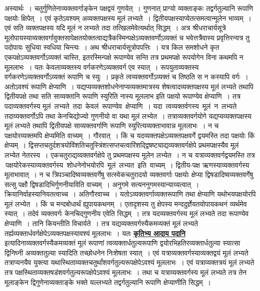 \documentclass[11pt, openany]{book}
\begin{document}
 अस्यार्थः~। चतुर्गुणितेनाव्यक्तवर्गाङ्केन पक्षद्वयं गुणयेत्~।
गुणनात् प्राग्यो व्यक्ताङ्कः तद्वर्गतुल्यानि रूपाणि पक्षयोः क्षिपेत्~। एवं
कृतेऽवश्यम् अव्यक्तपक्षस्य मूलं 
लभ्यते~। द्वितीयपक्षस्याप्येतत्समत्वान्मूलेन भाव्यम्~। एवं सति
व्यक्तपक्षस्य यदि 
मूलं न लभ्यते तदा तत्खिलमेवेत्यर्थात् सिद्धम्~। अत्र श्रीधराचार्यसूत्रे
मूलोपायस्याव्यक्तवर्गावुक्तसापेक्षतयोक्तत्वाद्यत्रैकस्मिन्पक्षेऽव्यक्तवर्णोऽव्यक्तं च
भवेत्तत्रैवास्य प्रवृत्तिरन्यत्र 
तु पदोपायः सुधिया स्वधिया चिन्त्यः~। अथ श्रीधराचार्यसूत्रोपपत्तिः~। यत्र
किल 
समशोधने कृत एकपक्षेऽव्यक्तवर्गोऽव्यक्तं चास्ति, इतरस्मिन्पक्षे
रूपाण्येव सन्ति तत्र 
प्रथमपक्षे रूपयोगेन विना कथमपि न मूललाभः~। यतः केवलाव्यक्तस्य वर्गकरणेऽव्यक्तवर्ग एव स्यात्~। रूपयुताव्यक्तस्य वर्गकरणेऽव्यक्तवर्गोऽव्यक्तं
रूपाणि च स्युः~। 
प्रकृते त्वव्यक्तवर्गोऽव्यक्तं च तिष्ठति स न कस्यापि वर्गः~। अतोऽवश्यं
रूपाणि 
क्षेप्याणि~। यद्यप्यव्यक्तशोधनेनाप्यव्यक्तमात्रस्य
शेषत्वादव्यक्तपक्षस्य मूलं लभ्यते 
तथापि द्वितीयपक्षे तथा सति साव्यक्तानि रूपाणि स्युरिति नास्य मूललाभ
इति 
पक्षयो रूपाण्येव क्षेप्याणि~। तत्र पदाव्यक्तवर्गस्य मूलं \,लभ्यते \,तदा \,केवलं \,रूपाण्येव \,क्षेप्याणि~। यदा \,त्वव्यक्तर्वगस्य \,मूलं \,न \,लभ्यते
तदाव्यक्तवर्गोऽपि तथा 
केनचिद्योज्यो गुणनीयो वा यथा मूलं लभ्येत~। तत्राव्यक्तवर्गयोगे
यद्यप्यव्यक्तपक्षस्य 
मूलं लभ्यते तथापि द्वितीयपक्षे साव्यक्तवर्गाणि रूपाणि
स्युरित्यव्यक्ताभावान्न 
मूललाभः~। न च पक्षयोरव्यक्तमपि क्षेप्यमिति वाच्यम्~। गौरवात्~। किं च 
यदव्यक्तपक्षेऽव्यक्तपक्षवर्गे द्वयमस्ति तदा पक्षयोः किं क्षेप्यम्~।
द्विसप्तचतुर्दशत्रयोविंशतिचतुस्त्रिंशत्सप्तचत्वारिंशद्द्विषष्ट्याद्यव्यक्तवर्गक्षेपे
प्रथमपक्षस्यैव मूलं लभ्येत नेतरस्य~। 
एकचतुराद्यव्यक्तवर्गक्षेपे तु प्रथमपक्षस्य मूलेन लभ्येत~। न च
यत्राव्यक्तवर्गद्वयमस्ति 
तत्र \,पक्षयोरेकस्याव्यक्तवर्गस्य \,शोधनेनोभयोरपि \,मूलं \,लभ्यत \,इति \,वाच्यम्~।
द्वितीय-पक्ष ऋणस्याव्यक्तवर्गस्य मूलाभावात्~। न च
त्रिपञ्चादिष्वव्यक्तवर्गेषु 
सत्स्वेकचतुरादयो व्यक्तवर्गाः पक्षयोः क्षेप्या
द्विषडादिष्वव्यक्तवर्गेषु सत्सु पक्षौ 
द्विषडादिभिर्गुणनीयाविति वाच्यम्~। अनुगमे सत्यननुगमस्यान्याय्यत्वात्~।
क्रियानिर्वाहस्यानियतत्वाच्च~। अतिगौरवाच्च~। यतोऽव्यक्तवर्गाव्यक्तरूपाणि तथा
क्षेप्याणि 
यथोभयपक्षयोरपि मूलं लभ्येत~। किं च मन्दबोधार्थं ह्युपायकथनम्~।
एतादृशस्य 
तु क्षेपस्य मन्ददुर्ज्ञेयतयोपायकथनं व्यर्थमेव स्यात्~। तदेवं
व्यक्तवर्गः केनचिद्गुणनीय 
एवेति सिद्धम्~। तत्र यदव्यक्तवर्गस्य मूलं लभ्यते तदा रूपाण्येव
क्षेप्याणि~। 
तानि कियन्तीति विचार्यते~। तत्र यद्यव्यक्तवर्गस्यैकमव्यक्तं मूलं लभ्यते
तर्ह्यव्यक्तार्धवर्गक्षेपेऽव्यक्तपक्षस्यावश्यं मूललाभः~। यतः \hyperref[31]{\textbf{कृतिभ्य आदाय पदानि}}
\newpage
\noindent इत्यादिनाव्यक्तवर्गस्यैकमव्यक्तं मूलं रूपाणां त्वव्यक्तार्धतुल्यरूपाणि
द्वयोरभिहतिरव्यक्तार्धतुल्या स्यात्सा द्विनिघ्नी अव्यक्ततुल्या स्यादिति तच्छोधनेन
निःशेषता स्यात्~। 
एवं यत्राव्यक्तवर्गस्याव्यक्तद्वयं मूलं लभ्यते तत्राप्यनयैव युक्त्या
यथास्थिताव्यक्तचतुर्थांशवर्गतुल्यरूपक्षेपेऽवश्यं मूललाभः~। एवं यत्राव्यक्तत्रयं मूलं लभ्यते
तत्र 
पक्षस्थिताव्यक्तषडंशवर्गतुल्यरूपक्षेपेऽवश्यं मूललाभः~। तथा च
यत्राव्यक्तवर्गस्य 
मूलं लभ्यते तत्र तेन मूलाङ्केन द्विगुणेनाव्यक्ताङ्के भक्ते यल्लभ्यते
तद्वर्गतुल्यानि 
रूपाणि क्षेप्याणीति सिद्धम्~। \\
\end{document}
